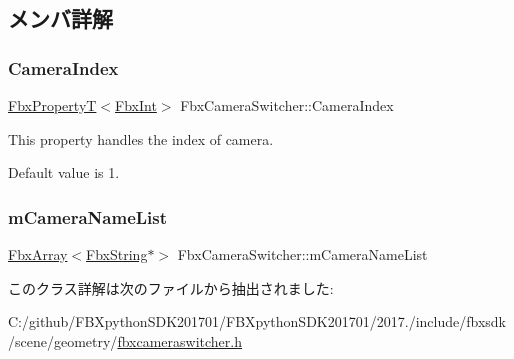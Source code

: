 \subsection{メンバ詳解}
\mbox{\label{class_fbx_camera_switcher_a9128f6b644b222070f2e34e69874a41d}} 
\subsubsection{\texorpdfstring{Camera\+Index}{CameraIndex}}
{\footnotesize\ttfamily \hyperlink{class_fbx_property_t}{Fbx\+PropertyT}$<$\hyperlink{fbxtypes_8h_a088fa96de3b0b3ea69f0f6afef525dfb}{Fbx\+Int}$>$ Fbx\+Camera\+Switcher\+::\+Camera\+Index}

This property handles the index of camera.

Default value is 1. \mbox{\label{class_fbx_camera_switcher_a03c2a77943c839af5cec42d8566724a9}} 
\subsubsection{\texorpdfstring{m\+Camera\+Name\+List}{mCameraNameList}}
{\footnotesize\ttfamily \hyperlink{class_fbx_array}{Fbx\+Array}$<$\hyperlink{class_fbx_string}{Fbx\+String}$\ast$$>$ Fbx\+Camera\+Switcher\+::m\+Camera\+Name\+List\hspace{0.3cm}{\ttfamily [protected]}}



このクラス詳解は次のファイルから抽出されました\+:\begin{DoxyCompactItemize}
\item 
C\+:/github/\+F\+B\+Xpython\+S\+D\+K201701/\+F\+B\+Xpython\+S\+D\+K201701/2017./include/fbxsdk/scene/geometry/\hyperlink{fbxcameraswitcher_8h}{fbxcameraswitcher.\+h}\end{DoxyCompactItemize}
